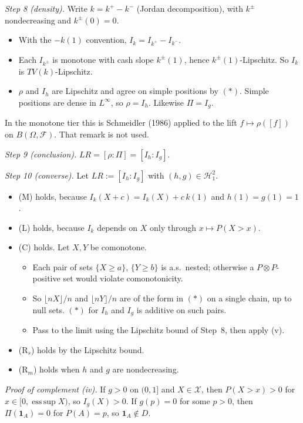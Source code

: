 \textit{Step 8 (density).} Write $k=k^+-k^-$ (Jordan decomposition), with $k^\pm$ nondecreasing and $k^\pm(0)=0$.
\begin{itemize}
\item With the $-k(1)$ convention, $I_k=I_{k^+}-I_{k^-}$.
\item Each $I_{k^\pm}$ is monotone with cash slope $k^\pm(1)$, hence $k^\pm(1)$-Lipschitz. So $I_k$ is $TV(k)$-Lipschitz.
\item $\rho$ and $I_h$ are Lipschitz and agree on simple positions by $(*)$. Simple positions are dense in $L^\infty$, so $\rho=I_h$. Likewise $\Pi=I_g$.
\end{itemize}
In the monotone tier this is Schmeidler (1986) applied to the lift $f\mapsto\rho([f])$ on $B(\Omega,\mathcal F)$. That remark is not used.

\textit{Step 9 (conclusion).} $LR=[\rho:\Pi]=[I_h:I_g]$.

\textit{Step 10 (converse).} Let $LR:=[I_h:I_g]$ with $(h,g)\in\mathcal H_1^2$.
\begin{itemize}
\item[(a)] (M) holds, because $I_k(X+c)=I_k(X)+c\,k(1)$ and $h(1)=g(1)=1$.
\item[(b)] (L) holds, because $I_k$ depends on $X$ only through $x\mapsto P(X>x)$.
\item[(c)] (C) holds. Let $X,Y$ be comonotone.
  \begin{itemize}
  \item Each pair of sets $\{X\ge a\}$, $\{Y\ge b\}$ is a.s.\ nested; otherwise a $P\otimes P$-positive set would violate comonotonicity.
  \item So $\lfloor nX\rfloor/n$ and $\lfloor nY\rfloor/n$ are of the form in $(*)$ on a single chain, up to null sets. $(*)$ for $I_h$ and $I_g$ is additive on such pairs.
  \item Pass to the limit using the Lipschitz bound of Step~8, then apply (v).
  \end{itemize}
\item[(d)] (R$_s$) holds by the Lipschitz bound.
\item[(e)] (R$_m$) holds when $h$ and $g$ are nondecreasing.
\end{itemize}

\emph{Proof of complement (iv).} If $g>0$ on $(0,1]$ and $X\in\mathcal X$, then $P(X>x)>0$ for $x\in[0,\operatorname{ess\,sup}X)$, so $I_g(X)>0$. If $g(p)=0$ for some $p>0$, then $\Pi(\mathbf 1_A)=0$ for $P(A)=p$, so $\mathbf 1_A\notin D$.

